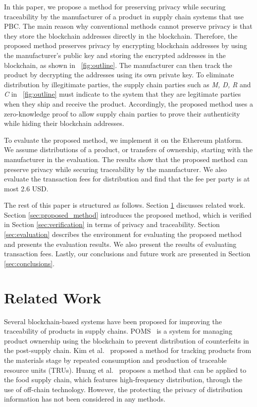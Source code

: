 \documentclass[conference]{IEEEtran}
\begin{document}
In this paper, we propose a method for preserving privacy while securing traceability by the manufacturer of a product in supply chain systems that use PBC.
The main reason why conventional methods cannot preserve privacy is that they store the blockchain addresses directly in the blockchain.
Therefore, the proposed method preserves privacy by encrypting blockchain addresses by using the manufacturer's public key and storing the encrypted addresses in the blockchain, as shown in \figurename~\ref{fig:outline}.
The manufacturer can then track the product by decrypting the addresses using its own private key.
To eliminate distribution by illegitimate parties, the supply chain parties such as \textit{M, D, R} and \textit{C} in \figurename~\ref{fig:outline} must indicate to the system that they are legitimate parties when they ship and receive the product.
Accordingly, the proposed method uses a zero-knowledge proof to allow supply chain parties to prove their authenticity while hiding their blockchain addresses.

To evaluate the proposed method, we implement it on the Ethereum platform.
We assume distributions of a product, or transfers of ownership, starting with the manufacturer in the evaluation.
The results show that the proposed method can preserve privacy while securing traceability by the manufacturer.
We also evaluate the transaction fees for distribution and find that the fee per party is at most 2.6 USD.


The rest of this paper is structured as follows.
Section \ref{sec:related_work} discusses related work.
Section \ref{sec:proposed_method} introduces the proposed method, which is verified in Section \ref{sec:verification} in terms of privacy and traceability.
Section \ref{sec:evaluation} describes the environment for evaluating the proposed method and presents the evaluation results. We also present the results of evaluating transaction fees.
Lastly, our conclusions and future work are presented in Section \ref{sec:conclusions}.


\section{Related Work}
\label{sec:related_work}
Several blockchain-based systems have been proposed for improving the traceability of products in supply chains.
POMS~\cite{Toyoda2017} is a system for managing product ownership using the blockchain to prevent distribution of counterfeits in the post-supply chain.
Kim et al.~\cite{TRU} proposed a method for tracking products from the materials stage by repeated consumption and production of traceable resource units (TRUs).
Huang et al.~\cite{HZL19} proposes a method that can be applied to the food supply chain, which features high-frequency distribution, through the use of off-chain technology.
However, the protecting the privacy of distribution information has not been considered in any methods.
\end{document}
